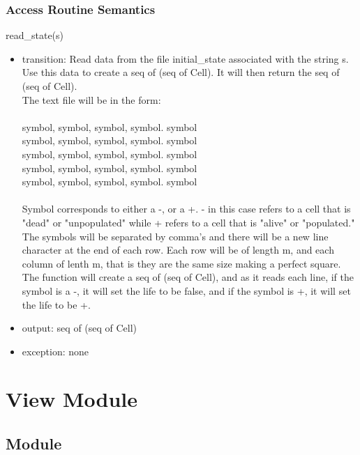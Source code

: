 \documentclass[12pt]{article}
\begin{document}
\subsubsection* {Access Routine Semantics}

read\_state(s)
\begin{itemize}
    \item transition: Read data from the file initial\_state associated with the string s. Use this data to create a seq of (seq of Cell). It will then return the seq of (seq of Cell).\\
    The text file will be in the form:\\
    \\
    symbol, symbol, symbol, symbol. symbol\\
    symbol, symbol, symbol, symbol. symbol\\
    symbol, symbol, symbol, symbol. symbol\\
    symbol, symbol, symbol, symbol. symbol\\
    symbol, symbol, symbol, symbol. symbol\\
    \\
    Symbol corresponds to either a -, or a +. - in this case refers to a cell that is "dead" or "unpopulated" while + refers to a cell that is "alive" or "populated." The symbols will be separated by comma's and there will be a new line character at the end of each row. Each row will be of length m, and each column of lenth m, that is they are the same size making a perfect square.\\
    
    The function will create a seq of (seq of Cell), and as it reads each line, if the symbol is a -, it will set the life to be false, and if the symbol is +, it will set the life to be +.
    
    \item output: seq of (seq of Cell)
    \item exception: none
\end{itemize}

\newpage

\section* {View Module}

\subsection*{Module}
\end{document}
